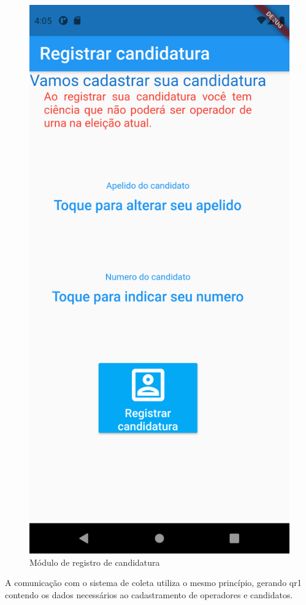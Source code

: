 \begin{figure}[!htb]
\begin{minipage}{0.45\textwidth}
	\includegraphics[width=.9\textwidth]{imagens/wallet_candidatura}
	\caption{Módulo de registro de candidatura}
	\label{fig:wallet_candidato}
\end{minipage}
\end{figure}
\clearpage

A comunicação com o sistema de coleta utiliza o mesmo princípio, gerando \gls{qr1} contendo os dados necessários ao cadastramento de operadores e candidatos. 

